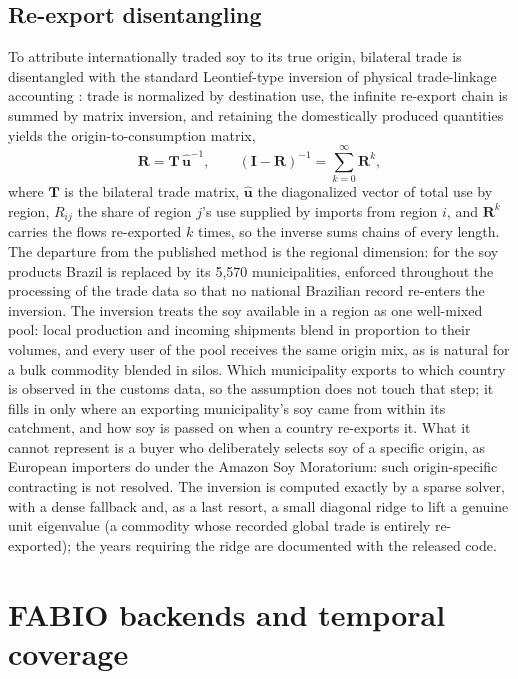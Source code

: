 \subsection{Re-export disentangling}\label{subsubsec:reexport}
To attribute internationally traded soy to its true origin, bilateral
trade is disentangled with the standard Leontief-type inversion of
physical trade-linkage accounting \cite{kastner2011tracing}: trade is
normalized by destination use, the infinite re-export chain is summed
by matrix inversion, and retaining the domestically produced
quantities yields the origin-to-consumption matrix,
\begin{equation}\label{eq:reex}
  \mathbf{R}=\mathbf{T}\,\hat{\mathbf{u}}^{-1},
  \qquad
  (\mathbf{I}-\mathbf{R})^{-1}=\sum_{k=0}^{\infty}\mathbf{R}^{k},
\end{equation}
where $\mathbf{T}$ is the bilateral trade matrix, $\hat{\mathbf{u}}$
the diagonalized vector of total use by region, $R_{ij}$ the share of
region $j$'s use supplied by imports from region $i$, and
$\mathbf{R}^{k}$ carries the flows re-exported $k$ times, so the
inverse sums chains of every length. The departure from
the published method is the regional dimension: for the soy products
Brazil is replaced by its 5{,}570 municipalities, enforced throughout
the processing of the trade data so that no national Brazilian record
re-enters the inversion. The inversion treats the soy available in a
region as one well-mixed pool: local production and incoming shipments
blend in proportion to their volumes, and every user of the pool
receives the same origin mix, as is natural for a bulk commodity
blended in silos. Which municipality exports to which country is
observed in the customs data, so the assumption does not touch that
step; it fills in only where an exporting municipality's soy came from
within its catchment, and how soy is passed on when a country
re-exports it. What it cannot represent is a buyer who deliberately
selects soy of a specific origin, as European importers do under the
Amazon Soy Moratorium: such origin-specific contracting is not
resolved. The inversion is computed exactly by a sparse solver,
with a dense fallback and, as a last resort, a small diagonal ridge to
lift a genuine unit eigenvalue (a commodity whose recorded global
trade is entirely re-exported); the years requiring the ridge are
documented with the released code.

\section{FABIO backends and temporal coverage}\label{app:nesting}

